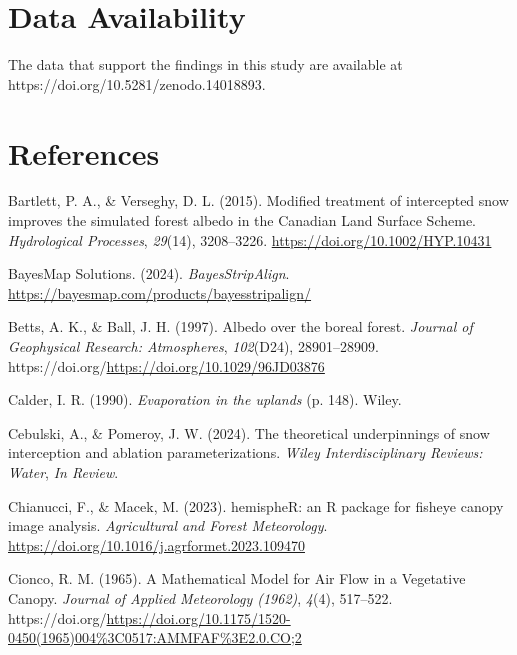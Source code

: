 \documentclass[
  letterpaper,
  DIV=11,
  numbers=noendperiod]{scrartcl}
\newlength{\cslhangindent}
\newenvironment{CSLReferences}[2] %
 {\begin{list}{}{%
  \setlength{\itemindent}{0pt}
  \setlength{\leftmargin}{0pt}
  \setlength{\parsep}{0pt}
  \ifodd #1
   \setlength{\leftmargin}{\cslhangindent}
   \setlength{\itemindent}{-1\cslhangindent}
  \fi
  \setlength{\itemsep}{#2\baselineskip}}}
 {\end{list}}
\begin{document}
\section{Data Availability}\label{data-availability}

The data that support the findings in this study are available at
https://doi.org/10.5281/zenodo.14018893.

\pagebreak

\section*{References}\label{references}

\label{refs}
\begin{CSLReferences}{1}{0}
Bartlett, P. A., \& Verseghy, D. L. (2015). {Modified treatment of
intercepted snow improves the simulated forest albedo in the Canadian
Land Surface Scheme}. \emph{Hydrological Processes}, \emph{29}(14),
3208--3226. \url{https://doi.org/10.1002/HYP.10431}

BayesMap Solutions. (2024). \emph{{BayesStripAlign}}.
\url{https://bayesmap.com/products/bayesstripalign/}

Betts, A. K., \& Ball, J. H. (1997). {Albedo over the boreal forest}.
\emph{Journal of Geophysical Research: Atmospheres}, \emph{102}(D24),
28901--28909. https://doi.org/\url{https://doi.org/10.1029/96JD03876}

Calder, I. R. (1990). \emph{{Evaporation in the uplands}} (p. 148).
Wiley.

Cebulski, A., \& Pomeroy, J. W. (2024). {The theoretical underpinnings
of snow interception and ablation parameterizations}. \emph{Wiley
Interdisciplinary Reviews: Water}, \emph{In Review}.

Chianucci, F., \& Macek, M. (2023). {hemispheR: an R package for fisheye
canopy image analysis}. \emph{Agricultural and Forest Meteorology}.
\url{https://doi.org/10.1016/j.agrformet.2023.109470}

Cionco, R. M. (1965). {A Mathematical Model for Air Flow in a Vegetative
Canopy}. \emph{Journal of Applied Meteorology (1962)}, \emph{4}(4),
517--522.
https://doi.org/\url{https://doi.org/10.1175/1520-0450(1965)004\%3C0517:AMMFAF\%3E2.0.CO;2}


\end{CSLReferences}
\end{document}
